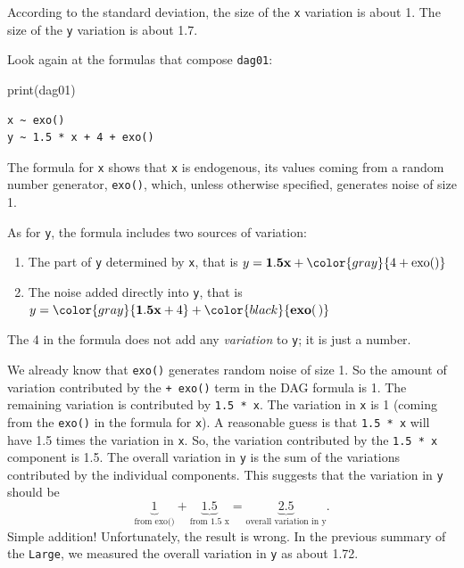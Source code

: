 \documentclass[
  letterpaper,
  DIV=11,
  numbers=noendperiod,
  oneside]{scrreprt}
\newenvironment{Shaded}{\begin{snugshade}}{\end{snugshade}}
\newcommand{\FunctionTok}[1]{\textcolor[rgb]{0.28,0.35,0.67}{#1}}
\newcommand{\NormalTok}[1]{\textcolor[rgb]{0.00,0.23,0.31}{#1}}
\providecommand{\tightlist}{%
  \setlength{\itemsep}{0pt}\setlength{\parskip}{0pt}}\usepackage{longtable,booktabs,array}
\begin{document}
According to the standard deviation, the size of the \texttt{x}
variation is about 1. The size of the \texttt{y} variation is about 1.7.

Look again at the formulas that compose \texttt{dag01}:

\begin{Shaded}
\begin{Highlighting}[]
\FunctionTok{print}\NormalTok{(dag01)}
\end{Highlighting}
\end{Shaded}

\begin{verbatim}
x ~ exo()
y ~ 1.5 * x + 4 + exo()
\end{verbatim}

The formula for \texttt{x} shows that \texttt{x} is endogenous, its
values coming from a random number generator, \texttt{exo()}, which,
unless otherwise specified, generates noise of size 1.

As for \texttt{y}, the formula includes two sources of variation:

\begin{enumerate}
\def\labelenumi{\arabic{enumi}.}
\tightlist
\item
  The part of \texttt{y} determined by \texttt{x}, that is
  \(y = \mathbf{1.5 x} + \color{gray}{4 + \text{exo()}}\)
\item
  The noise added directly into \texttt{y}, that is
  \(y = \color{gray}{\mathbf{1.5 x} + 4} + \color{black}{\mathbf{exo(\,)}}\)
\end{enumerate}

The 4 in the formula does not add any \emph{variation} to \texttt{y}; it
is just a number.

We already know that \texttt{exo()} generates random noise of size 1. So
the amount of variation contributed by the \texttt{+\ exo()} term in the
DAG formula is 1. The remaining variation is contributed by
\texttt{1.5\ *\ x}. The variation in \texttt{x} is 1 (coming from the
\texttt{exo()} in the formula for \texttt{x}). A reasonable guess is
that \texttt{1.5\ *\ x} will have 1.5 times the variation in \texttt{x}.
So, the variation contributed by the \texttt{1.5\ *\ x} component is
1.5. The overall variation in \texttt{y} is the sum of the variations
contributed by the individual components. This suggests that the
variation in \texttt{y} should be
\[\underbrace{1}_\text{from exo()} + \underbrace{1.5}_\text{from 1.5 x} = \underbrace{2.5}_\text{overall variation in y}.\]
Simple addition! Unfortunately, the result is wrong. In the previous
summary of the \texttt{Large}, we measured the overall variation in
\texttt{y} as about 1.72.
\end{document}
